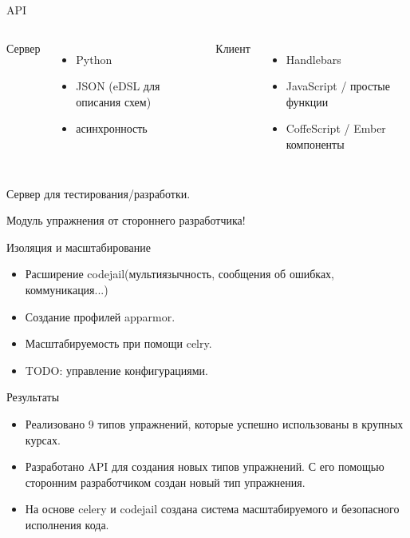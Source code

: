 \documentclass{beamer}
\begin{document}
\begin{frame}{API}
  \begin{columns}[t]
    Сервер
    \begin{itemize}
    \item Python
    \item JSON (eDSL для описания схем)
    \item асинхронность
    \end{itemize}

    Клиент
    \begin{itemize}
    \item Handlebars
    \item JavaScript / простые функции
    \item CoffeScript / Ember компоненты
    \end{itemize}
  \end{columns}

  \bigskip

  Сервер для тестирования/разработки.

  \medskip

  Модуль упражнения от стороннего разработчика!
\end{frame}

\begin{frame}{Изоляция и масштабирование}
  \begin{itemize}
  \item Расширение codejail(мультиязычность, сообщения об ошибках,
    коммуникация...)
  \item Создание профилей apparmor.
  \item Масштабируемость при помощи celry.
  \item TODO: управление конфигурациями.
  \end{itemize}
\end{frame}

\begin{frame}{Результаты}
  \begin{itemize}
  \item[\checkmark] Реализовано 9 типов упражнений, которые успешно использованы
    в крупных курсах.
  \item[\checkmark] Разработано API для создания новых типов упражнений. С его
    помощью сторонним разработчиком создан новый тип упражнения.
  \item[\checkmark] На основе celery и codejail создана система масштабируемого и
    безопасного исполнения кода.
  \end{itemize}
\end{frame}
\end{document}
